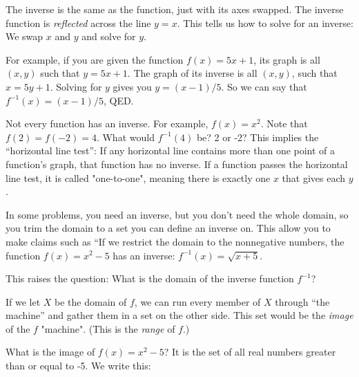 The inverse is the same as the function, just with its axes swapped.
The inverse function is \emph{reflected} across the line $y=x$. 
This tells us how to solve for an inverse: We swap $x$ and $y$ and
solve for $y$.

For example, if you are given the function $f(x) = 5x + 1$, its graph
is all $(x,y)$ such that $y = 5x + 1$.  The graph of its inverse is
all $(x, y)$, such that $x = 5y + 1$. Solving for $y$ gives you $y = (x -
1)/5$. So we can say that $f^{-1}(x) = (x - 1)/5$, QED.

Not every function has an inverse.  For example, $f(x) = x^2$.  Note
that $f(2) = f(-2) = 4$.  What would $f^{-1}(4)$ be? 2 or -2?  This
implies the ``horizontal line test'': If any horizontal line contains
more than one point of a function's graph, that function has no
inverse. If a function passes the horizontal line test, it is called 
"one-to-one", meaning there is exactly one $x$ that gives each $y$. \\
\begin{center}
\end{center}

In some problems, you need an inverse, but you don't need the
whole domain, so you trim the domain to a set you can define an
inverse on. This allow you to make claims such as ``If we restrict the domain to
the nonnegative numbers, the function $f(x) = x^2 - 5$ has an inverse:
$f^{-1}(x) =\sqrt{x + 5}$.

This raises the question: What is the domain of the inverse function $f^{-1}$?

If we let $X$ be the domain of $f$, we can run every member of $X$
through ``the machine'' and gather them in a set on the other
side. This set would be the \textit{image} of the $f$ "machine". (This is the \textit{range} of $f$.)

What is the image of $f(x) = x^2 - 5$? It is the set of all real
numbers greater than or equal to -5. We write this:

